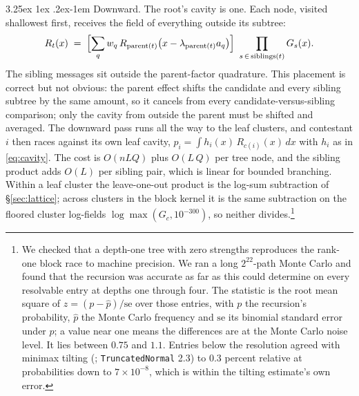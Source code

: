 \documentclass[11pt]{article}
\makeatletter
\renewcommand\paragraph{\@startsection{paragraph}{4}{\z@}%
  {3.25ex \@plus1ex \@minus.2ex}{-1em}%
  {\normalfont\normalsize\itshape}}
\makeatother
\begin{document}
\paragraph{Downward.} The root's cavity is one. Each node, visited shallowest
first, receives the field of everything outside its subtree:
\begin{equation}\label{eq:down}
R_t(x)\;=\;\Bigl[\sum_q w_q\,R_{\mathrm{parent}(t)}\!\left(x-\lambda_{\mathrm{parent}(t)}
a_q\right)\Bigr]\ \prod_{s\,\in\,\mathrm{siblings}(t)} G_s(x).
\end{equation}
The sibling messages sit outside the parent-factor quadrature. This
placement is correct but not obvious: the parent effect shifts the
candidate and every sibling subtree by the same amount, so it cancels
from every candidate-versus-sibling comparison; only the cavity from
outside the parent must be shifted and averaged. The downward pass runs
all the way to the leaf clusters, and contestant $i$ then races against its own leaf cavity,
$p_i=\int h_i(x)\,R_{c(i)}(x)\,dx$ with $h_i$ as in \eqref{eq:cavity}. The cost
is $O(nLQ)$ plus $O(L\,Q)$ per tree node, and the sibling product
adds $O(L)$ per sibling pair, which is linear for bounded branching.
Within a leaf cluster the leave-one-out product is the log-sum subtraction
of \S\ref{sec:lattice}; across clusters in the block kernel it is the same
subtraction on the floored cluster log-fields $\log\max(G_c,10^{-300})$,
so neither divides.\footnote{We checked that a depth-one tree with zero strengths reproduces the rank-one block race to machine
precision. We ran a long $2^{22}$-path Monte Carlo and found that the recursion was
accurate as far as this could determine on every resolvable
entry at depths one through four. The statistic is the root mean square
of $z=(p-\hat p)/\mathrm{se}$ over those entries, with $p$ the recursion's
probability, $\hat p$ the Monte Carlo frequency and $\mathrm{se}$ its
binomial standard error under $p$; a value near one means the
differences are at the Monte Carlo noise level. It lies between $0.75$
and $1.1$. Entries below the resolution agreed with minimax tilting
(\citealt{botev2017}; \texttt{TruncatedNormal} 2.3) to $0.3$ percent relative at probabilities down to
$7\times10^{-8}$, which is within the tilting estimate's own error.}
\end{document}

